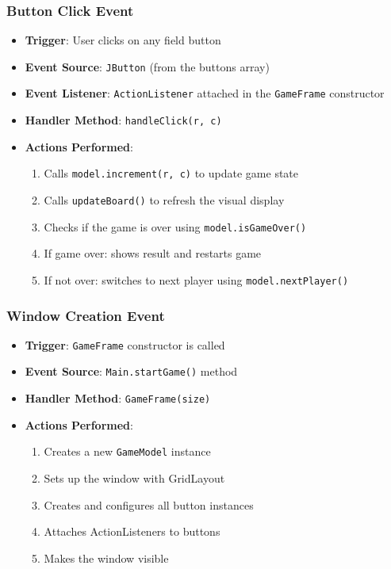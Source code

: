 \documentclass[12pt,a4paper]{article}
\begin{document}
\subsubsection{Button Click Event}
\begin{itemize}
    \item \textbf{Trigger}: User clicks on any field button
    \item \textbf{Event Source}: \texttt{JButton} (from the buttons array)
    \item \textbf{Event Listener}: \texttt{ActionListener} attached in the \texttt{GameFrame} constructor
    \item \textbf{Handler Method}: \texttt{handleClick(r, c)}
    \item \textbf{Actions Performed}:
    \begin{enumerate}
        \item Calls \texttt{model.increment(r, c)} to update game state
        \item Calls \texttt{updateBoard()} to refresh the visual display
        \item Checks if the game is over using \texttt{model.isGameOver()}
        \item If game over: shows result and restarts game
        \item If not over: switches to next player using \texttt{model.nextPlayer()}
    \end{enumerate}
\end{itemize}

\subsubsection{Window Creation Event}
\begin{itemize}
    \item \textbf{Trigger}: \texttt{GameFrame} constructor is called
    \item \textbf{Event Source}: \texttt{Main.startGame()} method
    \item \textbf{Handler Method}: \texttt{GameFrame(size)}
    \item \textbf{Actions Performed}:
    \begin{enumerate}
        \item Creates a new \texttt{GameModel} instance
        \item Sets up the window with GridLayout
        \item Creates and configures all button instances
        \item Attaches ActionListeners to buttons
        \item Makes the window visible
    \end{enumerate}
\end{itemize}
\end{document}
